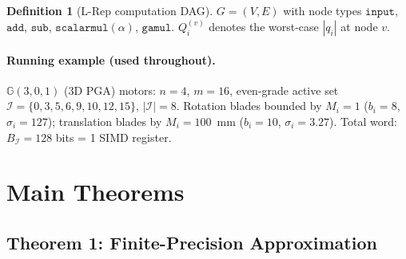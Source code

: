 \documentclass[11pt,a4paper]{article}
\theoremstyle{definition}
\newtheorem{definition}{Definition}[section]
\theoremstyle{plain}
\theoremstyle{remark}
\newcommand{\GA}{\mathbb{G}}
\begin{document}
\begin{definition}[L-Rep computation DAG]
$G=(V,E)$ with node types $\mathtt{input}$, $\mathtt{add}$,
$\mathtt{sub}$, $\mathtt{scalarmul}(\alpha)$, $\mathtt{gamul}$.
$Q_i^{(v)}$ denotes the worst-case $|q_i|$ at node $v$.
\end{definition}

\paragraph{Running example (used throughout).}
$\GA(3,0,1)$ (3D PGA) motors: $n=4$, $m=16$, even-grade active
set $\mathcal{I}=\{0,3,5,6,9,10,12,15\}$, $|\mathcal{I}|=8$.
Rotation blades bounded by $M_i=1$ ($b_i=8$, $\sigma_i=127$);
translation blades by $M_i=100$~mm ($b_i=10$, $\sigma_i=3.27$).
Total word: $B_\mathcal{I}=128$ bits = 1 SIMD register.

\section{Main Theorems}
\label{sec:main}

\subsection{Theorem 1: Finite-Precision Approximation}
\label{sec:approx}
\end{document}
